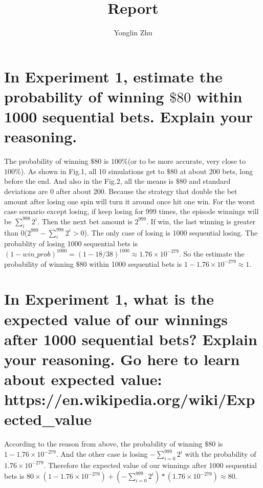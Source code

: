 \documentclass{svproc}
\begin{document}
\mainmatter              %
%

\title{Report}
%
%
\author{Yonglin Zhu }
%
%

\maketitle              %

\section{In Experiment 1, estimate the probability of winning $\$80$ within 1000 sequential bets. Explain your reasoning.}\label{sec1}

The probability of winning $\$80$ is $100\%$(or to be more accurate, very close to $100\%$). 
As shown in Fig.1, all 10 simulations get to $\$80$ at about 200 bets, long before the end. 
And also in the Fig.2, all the means is $\$80$ and standard deviations are 0 after about 200. 
Because the strategy that double the bet amount after losing one spin will turn it around once hit one win. 
For the worst case scenario except losing, if keep losing for 999 times, the episode winnings will be $\sum_i^{998} 2^i$. 
Then the next bet amount is $2^{999}$. If win, the last winning is greater than $0$($ 2^{999} - \sum_i^{998} 2^i>0$).
The only case of losing is 1000 sequential losing. 
The probablity of losing 1000 sequential bets is $(1-win\_prob)^{1000} = (1-18/38)^{1000} \approx1.76\times10^{-279}$. 
So the estimate the probability of winning $\$80$ within 1000 sequential bets is $1-1.76\times10^{-279}\approx 1$.


\section{In Experiment 1, what is the expected value of our winnings after 1000 sequential bets? Explain your reasoning. Go here to learn about expected value: https://en.wikipedia.org/wiki/Expected\_value}\label{sec2}
According to the reason from above, the probability of winning $\$80$ is $1-1.76\times10^{-279}$. 
And the other case is losing $- \sum_{i=0}^{999} 2^i$ with the probability of $1.76\times10^{-279}$. 
Therefore the expected value of our winnings after 1000 sequential bets is $80\times(1-1.76\times10^{-279})+(- \sum_{i=0}^{999} 2^i)*(1.76\times10^{-279}) \approx 80$.
\end{document}
